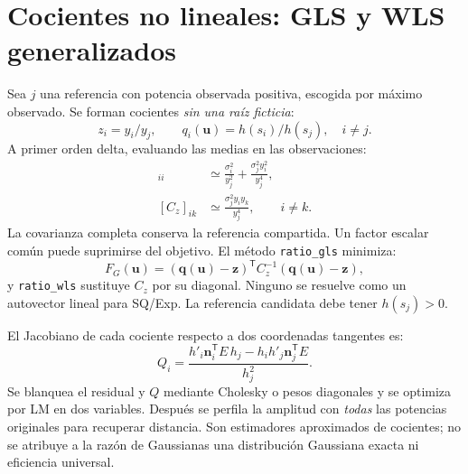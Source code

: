 \documentclass[11pt,a4paper]{article}
\begin{document}
\section{Cocientes no lineales: GLS y WLS generalizados}
Sea $j$ una referencia con potencia observada positiva, escogida por máximo observado. Se forman cocientes \emph{sin una raíz ficticia}:
\begin{equation}
 z_i=y_i/y_j,\qquad q_i(\mathbf u)=h(s_i)/h(s_j),\quad i\ne j.
\end{equation}
A primer orden delta, evaluando las medias en las observaciones:
\begin{align}
 [C_z]_{ii}&\simeq\frac{\sigma_i^2}{y_j^2}+\frac{\sigma_j^2y_i^2}{y_j^4},\\
 [C_z]_{ik}&\simeq\frac{\sigma_j^2y_i y_k}{y_j^4},\qquad i\ne k.
\end{align}
La covarianza completa conserva la referencia compartida. Un factor escalar común puede suprimirse del objetivo. El método \texttt{ratio\_gls} minimiza:
\begin{equation}
 F_G(\mathbf u)=(\mathbf q(\mathbf u)-\mathbf z)^{\mathsf T}C_z^{-1}(\mathbf q(\mathbf u)-\mathbf z),
\end{equation}
y \texttt{ratio\_wls} sustituye $C_z$ por su diagonal. Ninguno se resuelve como un autovector lineal para SQ/Exp. La referencia candidata debe tener $h(s_j)>0$.

El Jacobiano de cada cociente respecto a dos coordenadas tangentes es:
\begin{equation}
 Q_i=\frac{h'_i\mathbf n_i^{\mathsf T}E\,h_j-h_i h'_j\mathbf n_j^{\mathsf T}E}{h_j^2}.
\end{equation}
Se blanquea el residual y $Q$ mediante Cholesky o pesos diagonales y se optimiza por LM en dos variables. Después se perfila la amplitud con \emph{todas} las potencias originales para recuperar distancia. Son estimadores aproximados de cocientes; no se atribuye a la razón de Gaussianas una distribución Gaussiana exacta ni eficiencia universal.
\end{document}
